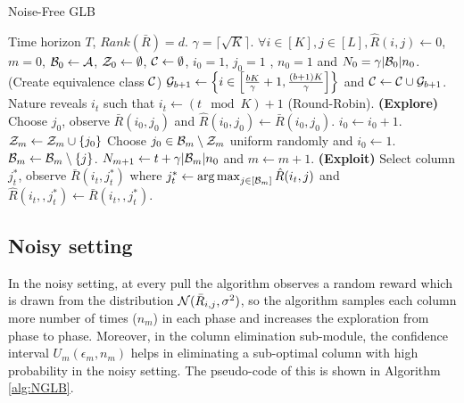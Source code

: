 \begin{algorithm}[!th]
\caption{Noise-Free GLB}
\label{alg:NFGLB}
\begin{algorithmic}[1]
 Time horizon $T$, $Rank(\bar{R}) = d$.
 $\gamma = \lceil\sqrt{K} \rceil$.
 $\forall i\in [K], j\in [L], \hat{R}(i,j) \leftarrow 0$, $m=0$, $\mathcal{B}_0 \leftarrow \mathcal{A}$, $\mathcal{Z}_0 \leftarrow \emptyset$, $\mathcal{C} \leftarrow \emptyset$,  $i_0=1$, $j_0=1$ , $n_0 = 1 $ and $N_0 = \gamma |\mathcal{B}_0|n_0$.
 (Create equivalence class $\mathcal{C}$)
\State  $\mathcal{G}_{b+1}\leftarrow \left\lbrace i\in \left[\frac{bK}{\gamma}+1,\frac{(b+1)K}{\gamma}\right]\right\rbrace$ and $\mathcal{C}\leftarrow \mathcal{C}\cup \mathcal{G}_{b+1}$.
\EndFor
{}	
\State Nature reveals $i_t$ such that $i_t \leftarrow (t \mod K) + 1$ (Round-Robin).
 \textbf{ (Explore) }
\State Choose $j_0$, observe $\bar{R}(i_0,j_0)$ and $\hat{R}(i_0,j_0)\leftarrow \bar{R}(i_0,j_0)$.
\State $i_0 \leftarrow i_0 + 1$.
\Else
\State $\mathcal{Z}_m \leftarrow \mathcal{Z}_m \cup \lbrace j_0\rbrace$
\State Choose $j_0\in\mathcal{B}_m\setminus \mathcal{Z}_m$ uniform randomly and $i_0 \leftarrow 1$.
\EndIf
\Else
\ColElim
\State {}
\State {}
\State $\mathcal{B}_m \leftarrow \mathcal{B}_m \setminus \lbrace j \rbrace$. 
\EndWhile
\EndFor
\EndColElim
\ResParam
\State $N_{m+1} \leftarrow t + \gamma |\mathcal{B}_m|n_0$ and $m \leftarrow m + 1$.
\EndResParam
\EndIf
\Else \textbf{ (Exploit) }
\State  Select column $j_t^*$, observe $\bar{R}(i_t,j_t^*)$ where $j_t^* \leftarrow \mathop{\rm arg\,max}_{j\in[\mathcal{B}_m]} {\hat{R}(i_t,j)}$ and $\hat{R}(i_t,,j_t^*)\leftarrow \bar{R}(i_t,,j_t^*)$.
\EndIf
\EndFor
\end{algorithmic}
\end{algorithm}


\subsection{Noisy setting}
\label{alg:noisy}

In the noisy setting, at every pull the algorithm observes a random reward which is drawn from the distribution $\mathcal{N}(\bar{R}_{i,j}, \sigma^2)$, so the algorithm samples each column more number of times ($n_m$) in each phase and increases the exploration from phase to phase. Moreover, in the column elimination sub-module, the confidence interval $U_m(\epsilon_m, n_m)$  helps in eliminating a sub-optimal column with high probability in the noisy setting. The pseudo-code of this is shown in Algorithm \ref{alg:NGLB}.


